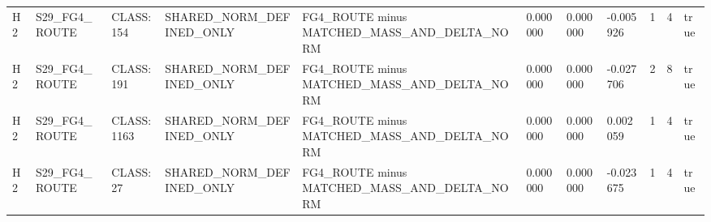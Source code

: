 \begin{tabular}{lllllllllll}
H2 & S29\_FG4\_ROUTE & CLASS:154 & SHARED\_NORM\_DEFINED\_ONLY & FG4\_ROUTE minus MATCHED\_MASS\_AND\_DELTA\_NORM & 0.000000 & 0.000000 & -0.005926 & 1 & 4 & true \\
H2 & S29\_FG4\_ROUTE & CLASS:191 & SHARED\_NORM\_DEFINED\_ONLY & FG4\_ROUTE minus MATCHED\_MASS\_AND\_DELTA\_NORM & 0.000000 & 0.000000 & -0.027706 & 2 & 8 & true \\
H2 & S29\_FG4\_ROUTE & CLASS:1163 & SHARED\_NORM\_DEFINED\_ONLY & FG4\_ROUTE minus MATCHED\_MASS\_AND\_DELTA\_NORM & 0.000000 & 0.000000 & 0.002059 & 1 & 4 & true \\
H2 & S29\_FG4\_ROUTE & CLASS:27 & SHARED\_NORM\_DEFINED\_ONLY & FG4\_ROUTE minus MATCHED\_MASS\_AND\_DELTA\_NORM & 0.000000 & 0.000000 & -0.023675 & 1 & 4 & true \\
\bottomrule
\end{tabular}
